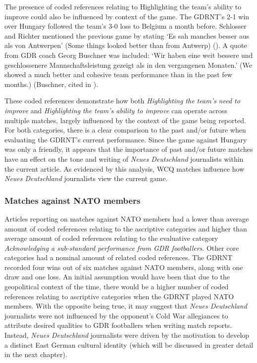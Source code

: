 The presence of coded references relating to Highlighting the team’s ability to improve could also be influenced by context of the game. The GDRNT’s 2-1 win over Hungary followed the team’s 3-0 loss to Belgium a month before. Schlosser and Richter mentioned the previous game by stating ‘Es sah manches besser aus als von Antwerpen’ (Some things looked better than from Antwerp) (\cite{nd19730517}). A quote from GDR coach Georg Buschner was included: ‘Wir haben eine weit bessere und geschlossenere Mannschaftsleistung gezeigt als in den vergangenen Monaten.’ (We showed a much better and cohesive team performance than in the past few months.) (Buschner, cited in \cite{nd19730517}).

These coded references demonstrate how both \textit{Highlighting the team’s need to improve} and \textit{Highlighting the team’s ability to improve} can operate across multiple matches, largely influenced by the context of the game being reported. For both categories, there is a clear comparison to the past and/or future when evaluating the GDRNT’s current performance. Since the game against Hungary was only a friendly, it appears that the importance of past and/or future matches have an effect on the tone and writing of \textit{Neues Deutschland} journalists within the current article. As evidenced by this analysis, WCQ matches influence how \textit{Neues Deutschland} journalists view the current game.

\subsubsection*{Matches against NATO members}

Articles reporting on matches against NATO members had a lower than average amount of coded references relating to the ascriptive categories and higher than average amount of coded references relating to the evaluative category \textit{Acknowledging a sub-standard performance from GDR footballers}. Other core categories had a nominal amount of related coded references. The GDRNT recorded four wins out of six matches against NATO members, along with one draw and one loss. An initial assumption would have been that due to the geopolitical context of the time, there would be a higher number of coded references relating to ascriptive categories when the GDRNT played NATO members. With the opposite being true, it may suggest that \textit{Neues Deutschland} journalists were not influenced by the opponent’s Cold War allegiances to attribute desired qualities to GDR footballers when writing match reports. Instead, \textit{Neues Deutschland} journalists were driven by the motivation to develop a distinct East German cultural identity (which will be discussed in greater detail in the next chapter).

